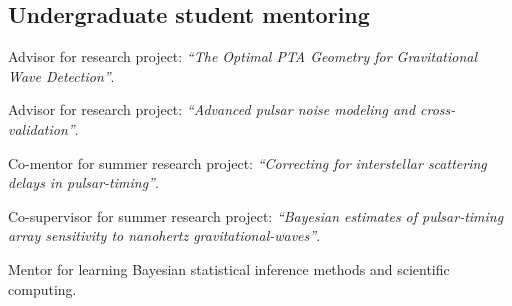 \documentclass[11pt,letterpaper,sans]{moderncv}
\begin{document}
\subsection{Undergraduate student mentoring}

\vspace{-0.1cm}
\hspace{0.71cm} Advisor for research project: \textit{``The Optimal PTA Geometry for Gravitational Wave Detection''}. %

\vspace{-0.1cm}
\hspace{0.71cm} Advisor for research project: \textit{``Advanced pulsar noise modeling and cross-validation''}. %

\vspace{-0.1cm}
\hspace{0.71cm} Co-mentor for summer research project: \textit{``Correcting for interstellar scattering \\ \vspace{-0.1cm}
\hspace{0.6cm} delays in pulsar-timing''}. \vspace{0.1cm}

\vspace{-0.1cm}
\hspace{0.71cm} Co-supervisor for summer research project: \textit{``Bayesian estimates of pulsar-timing \\ \vspace{-0.1cm}
\hspace{0.6cm} array sensitivity to nanohertz gravitational-waves''}. \vspace{0.1cm}

 \vspace{-0.1cm}
\hspace{0.71cm} Mentor for learning Bayesian statistical inference methods and scientific computing.
\end{document}
